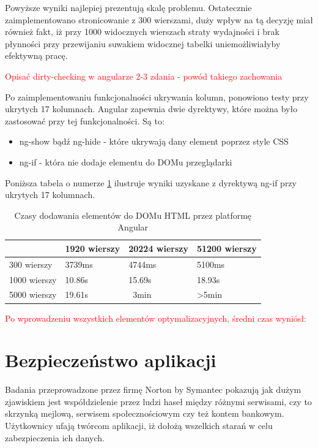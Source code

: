 \documentclass[a4paper,12pt,twoside]{article}
\begin{document}
Powyższe wyniki najlepiej prezentują skalę problemu. Ostatecznie zaimplementowano
stronicowanie z 300 wierszami, duży wpływ na tą decyzję miał również fakt, iż
przy 1000 widocznych wierszach straty wydajności i brak płynności przy przewijaniu
suwakiem widocznej tabelki uniemożliwiałyby efektywną pracę.

\textcolor{red}{Opisać dirty-checking w angularze 2-3 zdania - powód takiego zachowania}

Po zaimplementowaniu funkcjonalności ukrywania kolumn, ponowiono testy przy ukrytych 17 kolumnach. Angular zapewnia dwie dyrektywy, które można było zastosować przy tej funkcjonalności. Są to:
\begin{itemize}
\item ng-show bądź ng-hide - które ukrywają dany element poprzez style CSS
\item ng-if - która nie dodaje elementu do DOMu przeglądarki
\end{itemize}

Poniższa tabela o numerze \ref{table:tableRenderNgIf} ilustruje wyniki uzyskane z dyrektywą ng-if przy ukrytych 17 kolumnach.
\begin{table} [H]
\begin{tabular}{| p{3cm} | p{3cm} | p{3cm} | p{3cm}|}
\hline
& 1920 wierszy &  20224 wierszy & 51200 wierszy\\ 
\hline
300 wierszy& 3739ms& 4744ms& 5100ms\\ \hline  
1000 wierszy& 10.86s & 15.69s& 18.93s\\ \hline  
5000 wierszy& 19.61s& ~3min& >5min\\ \hline  
\end{tabular}
\caption{Czasy dodawania elementów do DOMu HTML przez platformę Angular}
\label{table:tableRenderNgIf}
\end{table}

\textcolor{red}{Po wprowadzeniu wszystkich elementów optymalizacyjnych, średni czas 
wyniósł: }

\newpage
\section{Bezpieczeństwo aplikacji}  
Badania przeprowadzone przez firmę Norton by Symantec \cite{nortonSec}
pokazują jak dużym zjawiskiem jest współdzielenie przez ludzi haseł między różnymi serwisami, czy to
skrzynką mejlową, serwisem społecznościowym czy też kontem bankowym.
Użytkownicy ufają twórcom aplikacji, iż dołożą wszelkich starań w celu zabezpieczenia ich 
danych. 
\end{document}
